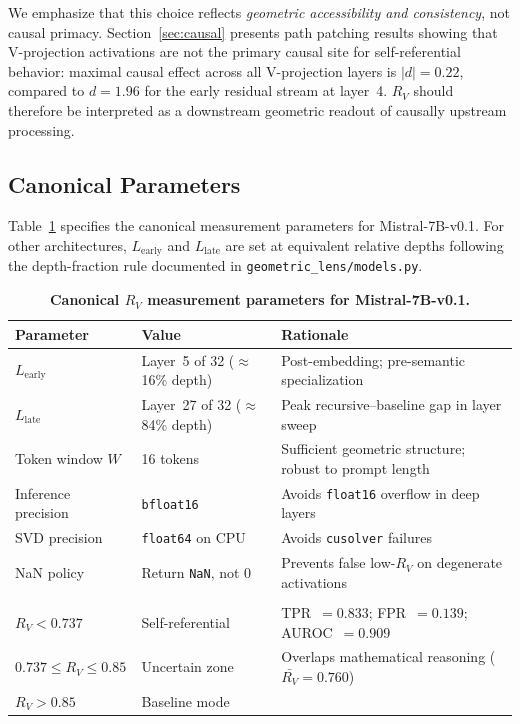 \documentclass{article}
\newcommand{\RV}{R_V}
\newcommand{\dcohen}{d}
\begin{document}
We emphasize that this choice reflects \emph{geometric accessibility and consistency}, not causal
primacy.
Section~\ref{sec:causal} presents path patching results showing that V-projection activations are
not the primary causal site for self-referential behavior: maximal causal effect across all
V-projection layers is $|\dcohen| = 0.22$, compared to $\dcohen = 1.96$ for the early residual
stream at layer~4.
$\RV$ should therefore be interpreted as a downstream geometric readout of causally upstream
processing.

\subsection{Canonical Parameters}

Table~\ref{tab:params} specifies the canonical measurement parameters for Mistral-7B-v0.1.
For other architectures, $L_\mathrm{early}$ and $L_\mathrm{late}$ are set at equivalent relative
depths following the depth-fraction rule documented in \texttt{geometric\_lens/models.py}.

\begin{table}[h]
\centering
\caption{\textbf{Canonical $\RV$ measurement parameters for Mistral-7B-v0.1.}}
\label{tab:params}
\smallskip
\begin{tabular}{>{\raggedright}p{3.2cm}p{3.5cm}p{6.6cm}}
\toprule
\textbf{Parameter} & \textbf{Value} & \textbf{Rationale} \\
\midrule
$L_\mathrm{early}$ & Layer~5 of 32 ($\approx$16\% depth) & Post-embedding; pre-semantic specialization \\
$L_\mathrm{late}$  & Layer~27 of 32 ($\approx$84\% depth) & Peak recursive--baseline gap in layer sweep \\
Token window $W$   & 16 tokens & Sufficient geometric structure; robust to prompt length \\
Inference precision & \texttt{bfloat16} & Avoids \texttt{float16} overflow in deep layers \\
SVD precision      & \texttt{float64} on CPU & Avoids \texttt{cusolver} failures \\
NaN policy         & Return \texttt{NaN}, not 0 & Prevents false low-$\RV$ on degenerate activations \\
\midrule
\multicolumn{3}{l}{\textit{Detection threshold (Mistral-7B only)}} \\
$\RV < 0.737$              & Self-referential & TPR~$= 0.833$; FPR~$= 0.139$; AUROC~$= 0.909$ \\
$0.737 \leq \RV \leq 0.85$ & Uncertain zone   & Overlaps mathematical reasoning ($\bar{\RV} = 0.760$) \\
$\RV > 0.85$               & Baseline mode    & \\
\bottomrule
\end{tabular}
\end{table}
\end{document}
